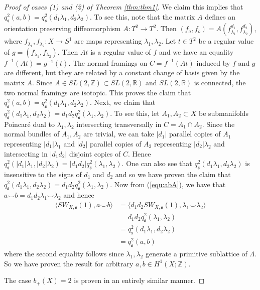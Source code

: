 \documentclass{amsart}
\theoremstyle{definition}
\theoremstyle{remark}
\numberwithin{equation}{section}
\begin{document}
\begin{proof}[Proof of cases (1) and (2) of Theorem \ref{thm:thm1}]
We claim this implies that $q^2_{\mathfrak{s}}( a , b ) = q^2_{\mathfrak{s}}( d_1 \lambda_1 , d_2 \lambda_2)$. To see this, note that the matrix $A$ defines an orientation preserving diffeomorphism $A : T^2 \to T^2$. Then $(f_a , f_b) = A( f_{\lambda_1}^{d_1} , f_{\lambda_2}^{d_2} )$, where $f_{\lambda_1} , f_{\lambda_2} : X \to S^1$ are maps representing $\lambda_1, \lambda_2$. Let $t \in T^2$ be a regular value of $g = (f_{\lambda_1} , f_{\lambda_2})$. Then $At$ is a regular value of $f$ and we have an equality $f^{-1}(At) = g^{-1}(t)$. The normal framings on $C = f^{-1}(At)$ induced by $f$ and $g$ are different, but they are related by a constant change of basis given by the matrix $A$. Since $A \in SL(2,\mathbb{Z}) \subset SL(2 , \mathbb{R})$ and $SL(2,\mathbb{R})$ is connected, the two normal framings are isotopic. This proves the claim that $q^2_{\mathfrak{s}}(a,b) = q^2_{\mathfrak{s}}(d_1\lambda_1 , d_2\lambda_2)$. Next, we claim that $q^2_{\mathfrak{s}}( d_1 \lambda_1 , d_2 \lambda_2) = d_1 d_2 q^2_{\mathfrak{s}}( \lambda_1 , \lambda_2)$. To see this, let $A_1, A_2 \subset X$ be submanifolds Poincar\'e dual to $\lambda_1, \lambda_2$ intersecting transversally in $C = A_1 \cap A_2$. Since the normal bundles of $A_1, A_2$ are trivial, we can take $|d_1|$ parallel copies of $A_1$ representing $|d_1| \lambda_1$ and $|d_2|$ parallel copies of $A_2$ representing $|d_2| \lambda_2$ and intersecting in $|d_1 d_2|$ disjoint copies of $C$. Hence $q^2_{\mathfrak{s}}( |d_1| \lambda_1 , |d_2| \lambda_2 ) = |d_1 d_2| q^2_{\mathfrak{s}}( \lambda_1 , \lambda_2)$. One can also see that $q^2_{\mathfrak{s}}( d_1 \lambda_1 , d_2 \lambda_2)$ is insensitive to the signs of $d_1$ and $d_2$ and so we have proven the claim that $q^2_{\mathfrak{s}}( d_1 \lambda_1 , d_2 \lambda_2) = d_1 d_2 q^2_{\mathfrak{s}}( \lambda_1 , \lambda_2)$. Now from (\ref{equ:abA}), we have that $a \smallsmile b = d_1 d_2 \lambda_1 \smallsmile \lambda_2$ and hence
\begin{align*}
\langle SW_{X , \mathfrak{s}}(1) , a \smallsmile b \rangle &= \langle d_1 d_2 SW_{X , \mathfrak{s}}(1) , \lambda_1 \smallsmile \lambda_2 \rangle \\
&= d_1 d_2 q^2_{\mathfrak{s}}( \lambda_1 , \lambda_2) \\
&= q^2_{\mathfrak{s}}( d_1\lambda_1 , d_2 \lambda_2 ) \\
&= q^2_{\mathfrak{s}}( a , b)
\end{align*}
where the second equality follows since $\lambda_1, \lambda_2$ generate a primitive sublattice of $\Lambda$. So we have proven the result for arbitrary $a,b \in H^1(X ; \mathbb{Z})$. 

The case $b_+(X) = 2$ is proven in an entirely similar manner.

\end{proof}
\end{document}
